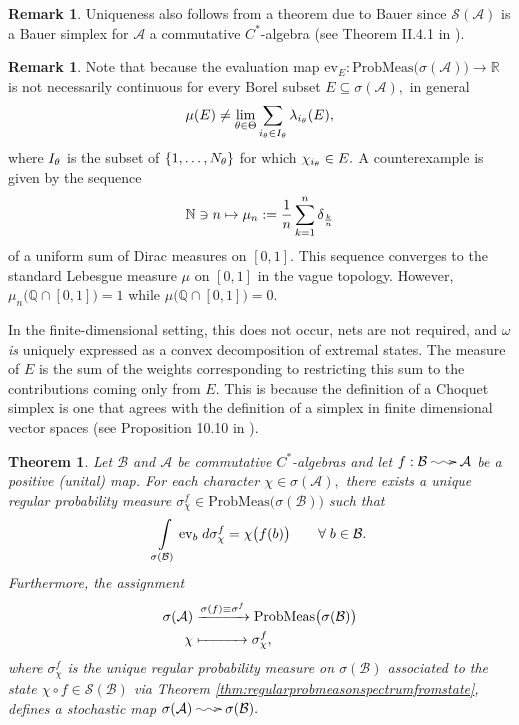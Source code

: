 \documentclass[12pt]{article}
\makeatletter
\edef\t{\pgfmathresult}%
\theoremstyle{theorem}
\newtheorem{theorem}[equation]{Theorem}
\theoremstyle{definition}
\newtheorem{remark}[equation]{Remark}
\numberwithin{equation}{section}
\let\l=\lambda \let\r=\rho
\let\s=\sigma \let\t=\tau \let\u=\upsilon \let\f=\phi \let\c=\chi
\let\w=\omega      \let\G=\Gamma \let\D=\Delta \let\Q=\Theta \let\L=\Lambda
\newcommand{\be}{\begin{equation}}
\newcommand{\ee}{\end{equation}}
\newcommand{\bt}{\begin{theorem}}
\newcommand{\et}{\end{theorem}}
\newcommand{\br}{\begin{remark}}
\newcommand{\er}{\end{remark}}
\newcommand{\<}{\langle}
\renewcommand{\>}{\rangle}
\def\R{{{\mathbb R}}}
\def\N{{{\mathbb N}}}
\def\Q{{{\mathbb Q}}}
\def\mA{{{\mathcal{A}}}}
\def\mS{{{\mathcal{S}}}}
\def\mB{{{\mathcal{B}}}}
\newcommand{\stoch}{\;\xy0;/r.25pc/:\ar@{~>}(3,0);(-3,0);\endxy\;}
\makeatother
\begin{document}
\br
Uniqueness also follows from a theorem due to Bauer
since $\mS(\mA)$ is a Bauer simplex for $\mA$ a commutative
$C^*$-algebra (see Theorem II.4.1 in \cite{Al71}). 
\er

\br
\label{rmk:lackofcontinuity}
Note that because the evaluation map 
$\mathrm{ev}_{E}:\mathrm{ProbMeas}\big(\s(\mA)\big)\to\R$ is not necessarily
continuous for every Borel subset $E\subseteq\s(\mA),$ in general
\be
\mu(E)\ne\lim_{\q\in\Theta}\sum_{i_{\theta}\in I_{\q}}\l_{i_{\theta}}(E),
\ee
where $I_{\theta}$ is the subset of $\{1,\dots,N_{\theta}\}$ for which 
$\chi_{i_\theta}\in E.$ 
A counterexample is given by the sequence 
\be
\N\ni n\mapsto\mu_{n}:=\frac{1}{n}\sum_{k=1}^{n}\de_{\frac{k}{n}}
\ee
of a uniform sum of Dirac measures on $[0,1].$ This sequence 
converges to the standard Lebesgue measure $\mu$ 
on $[0,1]$ in the vague topology.
However, 
$
\mu_{n}\big(\Q\cap[0,1]\big)=1
$
while
$\mu\big(\Q\cap[0,1]\big)=0.$ 

In the finite-dimensional setting, this does not occur, 
nets are not required, and $\w$ \emph{is}
uniquely expressed as a convex decomposition of extremal states. 
The measure of $E$ is the sum of the weights corresponding to
restricting this sum to the contributions coming only from $E.$ 
This is because the definition of a Choquet simplex is one that agrees
with the definition of a simplex in finite dimensional vector spaces
(see Proposition 10.10 in \cite{Ph01}). 
\er

\bt
\label{thm:representingpullbackstatesasmeasures}
Let $\mB$ and $\mA$ be commutative $C^*$-algebras and let 
$f:\mB\stoch\mA$ be a positive (unital) map. For each character
$\chi\in\s(\mA),$ there exists a unique regular probability measure
$\s^{f}_{\chi}\in\mathrm{ProbMeas}\big(\s(\mB)\big)$ 
such that 
\be
\label{eq:characterpullsbacktostate}
\int\displaylimits_{\s(\mB)}\mathrm{ev}_{b}\;d\s^{f}_{\chi}=\chi\big(f(b)\big)
\qquad\forall\;b\in\mB. 
\ee
Furthermore, the assignment 
\be
\begin{split}
\s(\mA)&\xrightarrow{\s(f)\equiv\s^{f}}\mathrm{ProbMeas}\big(\s(\mB)\big)\\
\chi&\xmapsto{\qquad\quad}\s^{f}_{\chi},
\end{split}
\ee
where $\s^{f}_{\chi}$ is the unique regular probability measure on $\s(\mB)$ 
associated to the state $\chi\circ f\in\mS(\mB)$ via Theorem  
\ref{thm:regularprobmeasonspectrumfromstate}, 
defines a stochastic map $\s(\mA)\stoch\s(\mB).$
\et
\end{document}
